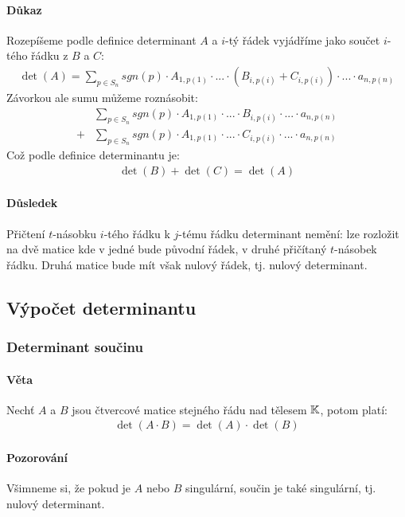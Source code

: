 \documentclass[a4paper,10pt]{article}
\begin{document}
\paragraph{Důkaz}
Rozepíšeme podle definice determinant $A$ a $i$-tý řádek vyjádříme jako součet 
$i$-tého řádku z $B$ a $C$:
\begin{align} 
	\det(A) = \sum_{p \in S_n} sgn(p) \cdot A_{1,p(1)} \cdot ... \cdot
	(B_{i,p(i)} + C_{i, p(i)}) \cdot ... \cdot a_{n, p(n)}
\end{align}
Závorkou ale sumu můžeme roznásobit:
\begin{align} 
	&\sum_{p \in S_n} sgn(p) \cdot A_{1,p(1)} \cdot ... \cdot
	B_{i,p(i)} \cdot ... \cdot a_{n, p(n)} \\
	+&\sum_{p \in S_n} sgn(p) \cdot A_{1,p(1)} \cdot ... \cdot
	C_{i, p(i)} \cdot ... \cdot a_{n, p(n)}
\end{align}
Což podle definice determinantu je:
\begin{align}
	\det(B) + \det(C) = \det(A)
\end{align}	

\paragraph{Důsledek}
Přičtení $t$-násobku $i$-tého řádku k $j$-tému řádku determinant nemění: lze rozložit
na dvě matice kde v jedné bude původní řádek, v druhé přičítaný $t$-násobek řádku.
Druhá matice bude mít však nulový řádek, tj. nulový determinant.

\subsection{Výpočet determinantu}
\setcounter{equation}{0}

\subsubsection{Determinant součinu}
\setcounter{equation}{0}
\paragraph{Věta}
Nechť $A$ a $B$ jsou čtvercové matice stejného řádu nad tělesem $\mathbb{K}$, potom
platí:
\begin{align*}
	\det (A \cdot B) = \det (A) \cdot \det (B)
\end{align*}


\paragraph{Pozorování}
Všimneme si, že pokud je $A$ nebo $B$ singulární, součin je také singulární, tj.
nulový determinant.
\end{document}
